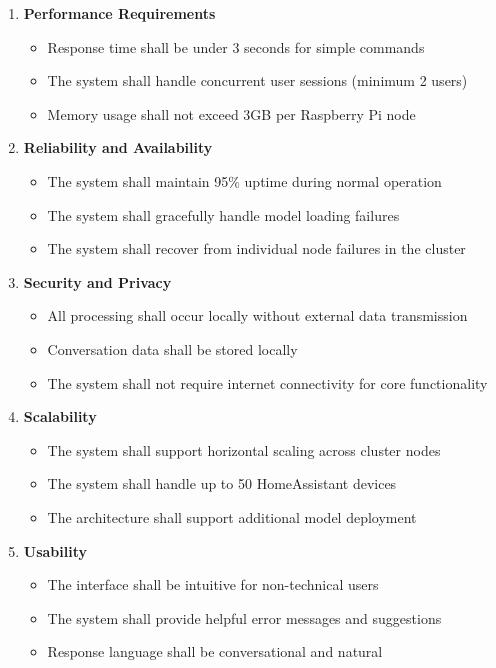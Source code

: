 \documentclass[12pt]{article}
\begin{document}
\begin{enumerate}[label=NFR-\arabic*]
\item \textbf{Performance Requirements}
    \begin{itemize}
    \item Response time shall be under 3 seconds for simple commands
    \item The system shall handle concurrent user sessions (minimum 2 users)
    \item Memory usage shall not exceed 3GB per Raspberry Pi node
    \end{itemize}

\item \textbf{Reliability and Availability}
    \begin{itemize}
    \item The system shall maintain 95\% uptime during normal operation
    \item The system shall gracefully handle model loading failures
    \item The system shall recover from individual node failures in the cluster
    \end{itemize}

\item \textbf{Security and Privacy}
    \begin{itemize}
    \item All processing shall occur locally without external data transmission
    \item Conversation data shall be stored locally
    \item The system shall not require internet connectivity for core functionality
    \end{itemize}

\item \textbf{Scalability}
    \begin{itemize}
    \item The system shall support horizontal scaling across cluster nodes
    \item The system shall handle up to 50 HomeAssistant devices
    \item The architecture shall support additional model deployment
    \end{itemize}

\item \textbf{Usability}
    \begin{itemize}
    \item The interface shall be intuitive for non-technical users
    \item The system shall provide helpful error messages and suggestions
    \item Response language shall be conversational and natural
    \end{itemize}


\end{enumerate}
\end{document}
